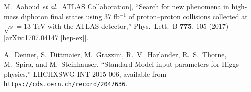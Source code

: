 \documentclass[11pt]{article}
\begin{document}
\begin{thebibliography}{99}
  M.~Aaboud {\it et al.} [ATLAS Collaboration],
  ``Search for new phenomena in high-mass diphoton final states using 37 fb$^{-1}$ of proton--proton collisions collected at $\sqrt{s}=13$ TeV with the ATLAS detector,''
  Phys.\ Lett.\ B {\bf 775}, 105 (2017)
  [arXiv:1707.04147 [hep-ex]].
        
A.~Denner, S.~Dittmaier, M.~Grazzini, R.~V.~Harlander, R.~S.~Thorne, M.~Spira, and M.~Steinhauser, 
``Standard Model input parameters for Higgs physics,''
LHCHXSWG-INT-2015-006, available from
\verb+https://cds.cern.ch/record/2047636+.
  
\end{thebibliography}
\end{document}
